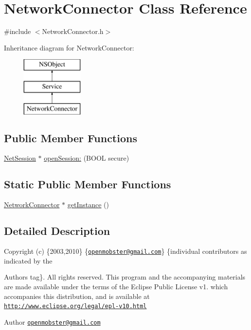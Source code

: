 \hypertarget{interface_network_connector}{
\section{\-Network\-Connector \-Class \-Reference}
\label{interface_network_connector}
}


{\ttfamily \#include $<$\-Network\-Connector.\-h$>$}

\-Inheritance diagram for \-Network\-Connector\-:\begin{figure}[H]
\begin{center}
\leavevmode
\includegraphics[height=3.000000cm]{interface_network_connector}
\end{center}
\end{figure}
\subsection*{\-Public \-Member \-Functions}
\begin{DoxyCompactItemize}
\item 
\hyperlink{interface_net_session}{\-Net\-Session} $\ast$ \hyperlink{interface_network_connector_aeb16d1f0952e1d2b3f32c8b2cbe7dc11}{open\-Session\-:} (\-B\-O\-O\-L secure)
\end{DoxyCompactItemize}
\subsection*{\-Static \-Public \-Member \-Functions}
\begin{DoxyCompactItemize}
\item 
\hyperlink{interface_network_connector}{\-Network\-Connector} $\ast$ \hyperlink{interface_network_connector_a3795d4ea42cac7c977213143c615bf1f}{get\-Instance} ()
\end{DoxyCompactItemize}


\subsection{\-Detailed \-Description}
\-Copyright (c) \{2003,2010\} \{\href{mailto:openmobster@gmail.com}{\tt openmobster@gmail.\-com}\} \{individual contributors as indicated by the \begin{DoxyAuthor}{\-Authors}
tag\}. \-All rights reserved. \-This program and the accompanying materials are made available under the terms of the \-Eclipse \-Public \-License v1. which accompanies this distribution, and is available at \href{http://www.eclipse.org/legal/epl-v10.html}{\tt http\-://www.\-eclipse.\-org/legal/epl-\/v10.\-html}
\end{DoxyAuthor}
\begin{DoxyAuthor}{\-Author}
\href{mailto:openmobster@gmail.com}{\tt openmobster@gmail.\-com} 
\end{DoxyAuthor}


